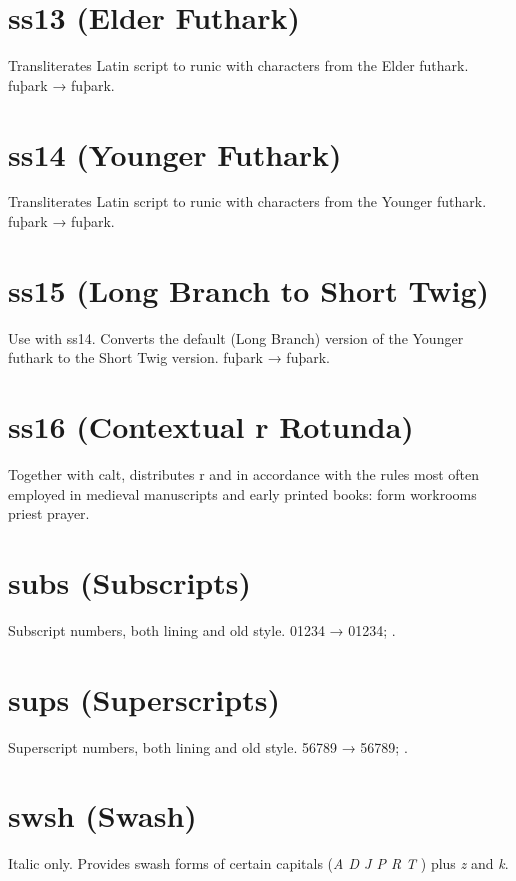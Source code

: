 \documentclass[12pt,letterpaper,openany]{book}
\begin{document}
\section{ss13 (Elder Futhark)}
Transliterates Latin script to runic with characters from the Elder futhark. fuþark
→ { fuþark}.

\section{ss14 (Younger Futhark)}
Transliterates Latin script to runic with characters from the Younger futhark. fuþark
→ { fuþark}.

\section{ss15 (Long Branch to Short Twig)}
Use with ss14. Converts the default (Long Branch) version of the Younger futhark
to the Short Twig version. fuþark
→ { fuþark}.

\section{ss16 (Contextual r Rotunda)}
Together with calt, distributes r and
 in accordance with the rules most often employed in medieval manuscripts and early printed books: { form workrooms priest prayer}.

\section{subs (Subscripts)}
Subscript numbers, both lining and old style. 01234 →
{ 01234};
.

\section{sups (Superscripts)}
Superscript numbers, both lining and old style. 56789 →
{ 56789};
.

\section{swsh (Swash)}
Italic only. Provides swash forms of certain capitals
{(\textit{A D J P R T} ) plus \textit{z} and \textit{k}.}
\end{document}
